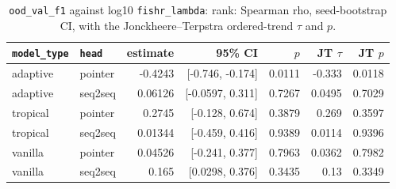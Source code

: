 \documentclass[10pt]{article}
\begin{document}
{\small
\begin{longtable}{llrrrrr}
\caption{\texttt{ood\_val\_f1} against log10 \texttt{fishr\_lambda}: rank: Spearman rho, seed-bootstrap CI, with the Jonckheere--Terpstra ordered-trend $\tau$ and $p$.}\label{tab:trend-ood_val_f1}\\
\toprule
\texttt{model\_type} & \texttt{head} & estimate & 95\% CI & $p$ & JT $\tau$ & JT $p$\\
\midrule
\endhead
adaptive & pointer & -0.4243 & [-0.746, -0.174] & 0.0111 & -0.333 & 0.0118\\
adaptive & seq2seq & 0.06126 & [-0.0597, 0.311] & 0.7267 & 0.0495 & 0.7029\\
tropical & pointer & 0.2745 & [-0.128, 0.674] & 0.3879 & 0.269 & 0.3597\\
tropical & seq2seq & 0.01344 & [-0.459, 0.416] & 0.9389 & 0.0114 & 0.9396\\
vanilla & pointer & 0.04526 & [-0.241, 0.377] & 0.7963 & 0.0362 & 0.7982\\
vanilla & seq2seq & 0.165 & [0.0298, 0.376] & 0.3435 & 0.13 & 0.3349\\
\bottomrule
\end{longtable}
}
\end{document}
